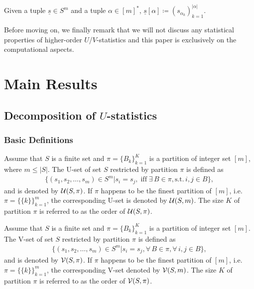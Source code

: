 \documentclass[letterpaper,11pt]{article}
\newcommand{\uset}{\calU}
\newcommand{\usetp}[2]{\uset(#1,#2)}
\newcommand{\vset}{\calV}
\newcommand{\vsetp}[2]{\vset(#1,#2)}
\begin{document}
\begin{bibunit}[plainnat]
Given a tuple $\underline{s} \in S^m$ and a tuple $\alpha \in [m]^*$, $\underline{s}[\alpha] \coloneqq (s_
{\alpha_k})_{k=1}^{|\alpha|}$.

Before moving on, we finally remark that we will not discuss any statistical properties of higher-order $U$/$V$-statistics and this paper is exclusively on the computational aspects. 


\section{Main Results}
\label{sec:main}

\subsection{Decomposition of \texorpdfstring{$U$}{U}-statistics}
\subsubsection{Basic Definitions}
\begin{definition}[U-set]\label{def:u_set}
    Assume that $S$ is a finite set and $\pi = \{B_k\}_{k=1}^K$ is a partition of integer set $[m]$, where $m \leq |S|$. The U-set of set $S$ restricted by partition $\pi$ is defined as
    \begin{align*}
        \{(s_1, s_2,\ldots,s_m) \in S^m | s_i = s_j, \;\mathrm{iff} \; \exists \, B \in \pi, \mathrm{s.t.} \, i,j \in B\}, 
    \end{align*}
    and is denoted by $\usetp{S}{\pi}$. If $\pi$ happens to be the finest partition of $[m]$, i.e. $\pi = \{\{k\}\}_{k=1}^m$, the corresponding U-set is denoted by $\usetp{S}{m}$. The size $K$ of partition $\pi$ is referred to as the order of $\usetp{S}{\pi}$.
\end{definition}

\begin{definition}[V-set]\label{def:v_set}
    Assume that $S$ is a finite set and $\pi = \{B_k\}_{k=1}^K$ is a partition of integer set $[m]$. The V-set of set $S$ restricted by partition $\pi$ is defined as
    \begin{align*}
        \{(s_1, s_2,\ldots,s_m) \in S^m | s_i = s_j, \forall \, B \in \pi, \forall \, i, j \in B\}, 
    \end{align*}
    and is denoted by $\vsetp{S}{\pi}$. If $\pi$ happens to be the finest partition of $[m]$, i.e. $\pi = \{\{k\}\}_{k=1}^m$, the corresponding V-set denoted by $\vsetp{S}{m}$. The size $K$ of partition $\pi$ is referred to as the order of $\vsetp{S}{\pi}$.
\end{definition}


\end{bibunit}
\end{document}
